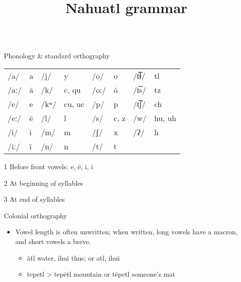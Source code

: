 \documentclass[12pt]{beamer}
\title{Nahuatl grammar}
\newcommand{\nah}[1]{\textcolor{nahgrn}{#1}}
\newcommand{\trs}[1]{\textcolor{nahblu}{#1}}
\begin{document}
\begin{frame}%
  \begin{columns}[t]
    \begin{column}{.22\linewidth}
      \begin{block}{Phonology \& standard orthography}
        \begin{threeparttable}
          \begin{tabular}{l@{\,}l@{\qquad}l@{\,}l@{\qquad}l@{\,}l@{\qquad}l@{\,}l}
            /a/  & \nah{a} & /j/ & \nah{y} & /o/ & \nah{o} & /t͡ɬ/ & \nah{tl} \\
            /aː/ & \nah{ā} & /k/  & \nah{c}, \nah{qu}\tnote{1}           & /oː/ & \nah{ō}                   & /t͡s/ & \nah{tz}                             \\
            /e/  & \nah{e} & /kʷ/ & \nah{cu}\tnote{2}, \nah{uc}\tnote{3} & /p/  & \nah{p}                   & /t͡ʃ/ & \nah{ch}                             \\
            /eː/ & \nah{ē} & /l/  & \nah{l}                              & /s/  & \nah{c}\tnote{1}, \nah{z} & /w/   & \nah{hu}\tnote{2}, \nah{uh}\tnote{3} \\
            /i/  & \nah{i} & /m/ & \nah{m} & /ʃ/ & \nah{x} & /ʔ/   & \nah{h}  \\
            /iː/ & \nah{ī} & /n/ & \nah{n} & /t/ & \nah{t} &       &         
          \end{tabular}
          \begin{tablenotes}
          \item[1] Before front vowels: \nah{e, ē, i, ī}
          \item[2] At beginning of syllables
          \item[3] At end of syllables  
          \end{tablenotes}
        \end{threeparttable}
      \end{block}
      \begin{block}{Colonial orthography}
        \begin{itemize}
        \item Vowel length is often unwritten; when written, long vowels have a macron, and short vowels a breve.
          \begin{itemize}
          \item  \nah{ātl} \trs{water}, \nah{ĭhui} \trs{thus}; or \nah{atl}, \nah{ihui}
          \item  \nah{tepetl} > \nah{tepētl} \trs{mountain} or \nah{tēpetl} \trs{someone's mat}

\end{itemize}
\end{itemize}
\end{block}
\end{column}
\end{columns}
\end{frame}
\end{document}
